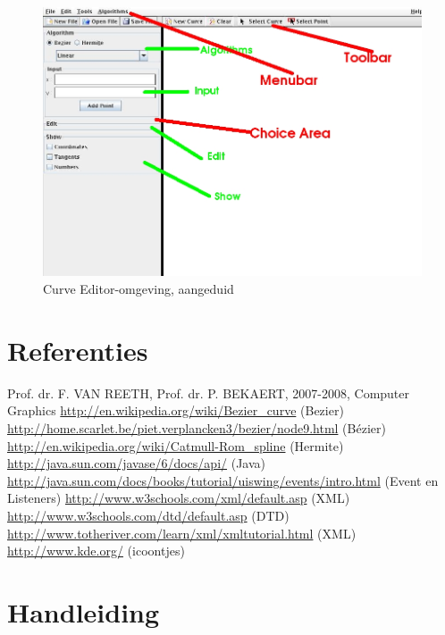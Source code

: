 \documentclass[a4paper,11pt,oneside, titlepage]{article}
\begin{document}
\begin{figure}[htbp]
\centering
\includegraphics[scale=0.4]{./screenies/startMarked.jpg}
\caption{Curve Editor-omgeving, aangeduid}\label{scrTot}
\end{figure}
\newpage
\section{Referenties}
Prof. dr. F. VAN REETH, Prof. dr. P. BEKAERT, 2007-2008, Computer Graphics\newline
\url{http://en.wikipedia.org/wiki/Bezier\_curve} (Bezier)\newline
\url{http://home.scarlet.be/piet.verplancken3/bezier/node9.html} (B\'ezier)\newline
\url{http://en.wikipedia.org/wiki/Catmull-Rom\_spline} (Hermite)\newline
\url{http://java.sun.com/javase/6/docs/api/} (Java)\newline
\url{http://java.sun.com/docs/books/tutorial/uiswing/events/intro.html} (Event en Listeners)\newline
\url{http://www.w3schools.com/xml/default.asp} (XML)\newline
\url{http://www.w3schools.com/dtd/default.asp} (DTD)\newline
\url{http://www.totheriver.com/learn/xml/xmltutorial.html} (XML)\newline
\url{http://www.kde.org/} (icoontjes)\newline
\section{Handleiding}
\newpage
\end{document}
